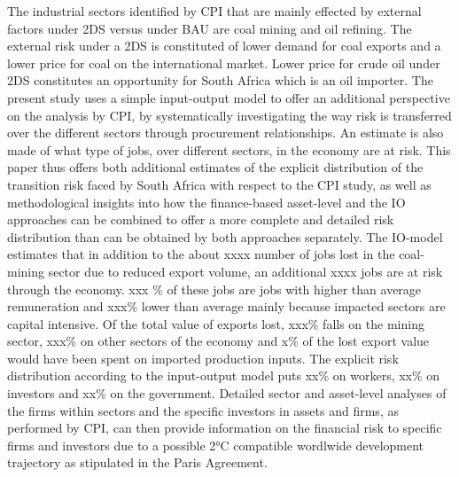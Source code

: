 \documentclass[12pt,english]{article}
\begin{document}
The industrial sectors identified by CPI that are mainly effected by external factors under 2DS versus under BAU %
are coal mining and oil refining. The external risk under a 2DS is constituted of lower demand for coal exports and a lower price for coal on the international market. Lower price for crude oil under 2DS constitutes an opportunity for South Africa which is an oil importer. The present study uses a simple input-output model to offer an additional perspective on the analysis by CPI, by systematically investigating the way risk is transferred over the different sectors through procurement relationships. %
An estimate is also made of what type of jobs, over different sectors, in the economy are at risk. %
This paper thus offers both additional estimates of the explicit distribution of the transition risk faced by South Africa with respect to the CPI study, as well as methodological insights into how the finance-based asset-level and the IO approaches can be combined to offer a more complete and detailed risk distribution than can be obtained by both approaches separately.
The IO-model estimates that in addition to the about xxxx number of jobs lost in the coal-mining sector due to reduced export volume, an additional xxxx jobs are at risk through the economy. xxx \% of these jobs are jobs with higher than average remuneration and xxx\% lower than average mainly because impacted sectors are capital intensive. Of the total value of exports lost, xxx\% falls on the mining sector, xxx\% on other sectors of the economy and x\% of the lost export value would have been spent on imported production inputs. The explicit risk distribution according to the input-output model puts xx\% on workers, xx\% on investors and xx\% on the government. Detailed sector and asset-level analyses of the firms within sectors and the specific investors in assets and firms, as performed by CPI, can then provide information on the financial risk to specific firms and investors due to a possible 2°C compatible wordlwide development trajectory as stipulated in the Paris Agreement. %
\end{document}
